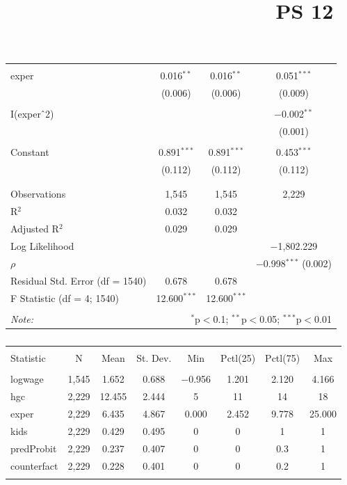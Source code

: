 \documentclass{article} \usepackage[utf8]{inputenc} \title{PS 12}
\begin{document}
\begin{table}[!htbp]
\begin{tabular}{@{\extracolsep{5pt}}lccc}
  & & & \\
 exper & 0.016$^{**}$ & 0.016$^{**}$ & 0.051$^{***}$ \\
  & (0.006) & (0.006) & (0.009) \\
  & & & \\
 I(exper$\hat{\mkern6mu}$2) & & & $-$0.002$^{**}$ \\
  & & & (0.001) \\
  & & & \\
 Constant & 0.891$^{***}$ & 0.891$^{***}$ & 0.453$^{***}$ \\
  & (0.112) & (0.112) & (0.112) \\
  & & & \\ \hline \\[-1.8ex] Observations & 1,545 & 1,545 & 2,229 \\ 
R$^{2}$ & 0.032 & 0.032 & \\ Adjusted R$^{2}$ & 0.029 & 0.029 & \\ Log 
Likelihood & & & $-$1,802.229 \\ $\rho$ & & & $-$0.998$^{***}$ (0.002) 
\\ Residual Std. Error (df = 1540) & 0.678 & 0.678 & \\ F Statistic (df 
= 4; 1540) & 12.600$^{***}$ & 12.600$^{***}$ & \\ \hline \hline 
\\[-1.8ex] \textit{Note:} & \multicolumn{3}{r}{$^{*}$p$<$0.1; 
$^{**}$p$<$0.05; $^{***}$p$<$0.01} \\ \end{tabular} \end{table} 
\begin{table}[!htbp] \centering
  \caption{}
  \label{} \begin{tabular}{@{\extracolsep{5pt}}lccccccc} 
\\[-1.8ex]\hline \hline \\[-1.8ex] Statistic & \multicolumn{1}{c}{N} & 
\multicolumn{1}{c}{Mean} & \multicolumn{1}{c}{St. Dev.} & 
\multicolumn{1}{c}{Min} & \multicolumn{1}{c}{Pctl(25)} & 
\multicolumn{1}{c}{Pctl(75)} & \multicolumn{1}{c}{Max} \\ \hline 
\\[-1.8ex] logwage & 1,545 & 1.652 & 0.688 & $-$0.956 & 1.201 & 2.120 & 
4.166 \\ hgc & 2,229 & 12.455 & 2.444 & 5 & 11 & 14 & 18 \\ exper & 
2,229 & 6.435 & 4.867 & 0.000 & 2.452 & 9.778 & 25.000 \\ kids & 2,229 & 
0.429 & 0.495 & 0 & 0 & 1 & 1 \\ predProbit & 2,229 & 0.237 & 0.407 & 0 
& 0 & 0.3 & 1 \\ counterfact & 2,229 & 0.228 & 0.401 & 0 & 0 & 0.2 & 1 
\\ \hline \\[-1.8ex] \end{tabular} \end{table} 
\end{document}
